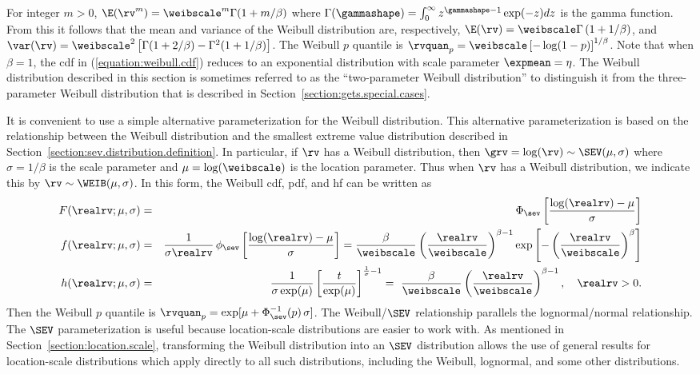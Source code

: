 For integer $m > 0$, $\E(\rv^{m})=\weibscale^{m}
\Gamma(1+{m}/{\beta})$ where
$\Gamma(\gammashape)=\int^{\infty}_{0} z^{\gammashape-1} \exp(-z) dz$
is the gamma function. 
From this it follows that the mean and
variance of the Weibull distribution are, respectively, $\E(\rv)=
\weibscale
\Gamma \left (1+1/\beta \right )$, and
$\var(\rv)=
\weibscale^{2} \left [\Gamma(1+2/\beta)
-\Gamma^{2}(1+1/\beta) \right]$. The Weibull $p$ quantile
is $\rvquan_{p}=\weibscale \left [-\log(1-p)
\right ]^{1/\beta}$.   Note that when $\beta=1$, the cdf in
(\ref{equation:weibull.cdf}) reduces to an exponential distribution
with scale parameter $\expmean=\eta$.
The Weibull distribution
described in this section is sometimes referred to as the
``two-parameter Weibull distribution'' to distinguish it from the
three-parameter Weibull distribution that is described in
Section~\ref{section:gets.special.cases}.

It is convenient to use a simple alternative parameterization for the
Weibull distribution.  This alternative parameterization is based on
the relationship between the Weibull distribution and the
smallest extreme value distribution described in
Section~\ref{section:sev.distribution.definition}.  In particular, if
$\rv$ has a Weibull distribution, then $\grv=\log(\rv) \sim
\SEV(\mu, \sigma)$ where $\sigma=1/\beta$ is the scale parameter and
$\mu=\log(\weibscale)$ is the location parameter.  Thus when $\rv$
has a Weibull distribution, we indicate this by $ \rv \sim
\WEIB(\mu, \sigma)$. In this form, the Weibull cdf, pdf, and hf
can be written as
\begin{eqnarray}
\label{equation:weibull.cdf.mu.sigma}
 F(\realrv;\mu,\sigma)&=&\Phi_{\sev}\left [\frac{\log(\realrv)-\mu}{\sigma}
\right ] \\
 f(\realrv;\mu,\sigma)&=&\frac{1}{ \sigma \realrv} \, \phi_{\sev}
\left [ 
\frac{\log(\realrv)-\mu}{\sigma} \right]=
\frac{\beta}{\weibscale}
\left (\frac{\realrv}{\weibscale} \right )^{\beta-1}
\exp \left [-\left (\frac{\realrv}{\weibscale} \right )^{\beta}
\right ] \nonumber
\\
 h(\realrv;\mu, \sigma)&=&
\frac{1}{\sigma\exp(\mu)}\left[\frac{t}{\exp(\mu)}  \right]^{\frac{1}{\sigma}-1} =
\,\, \frac{\beta}{\weibscale}
\left (\frac{\realrv}{\weibscale} \right )^{\beta-1},  \quad \realrv > 0.
\nonumber
\end{eqnarray} 
Then the Weibull $p$ quantile is $\rvquan_{p}=\exp[\mu +
\Phi^{-1}_{\sev}(p) \, \sigma]$.  The Weibull/$\SEV$ relationship
parallels the lognormal/normal relationship. The $\SEV$
parameterization is useful because location-scale distributions are
easier to work with.  As mentioned in
Section~\ref{section:location.scale}, transforming the Weibull
distribution into an $\SEV$ distribution allows the use of
general results for location-scale distributions which apply
directly to all such distributions, including the
Weibull, lognormal, and some other distributions.

